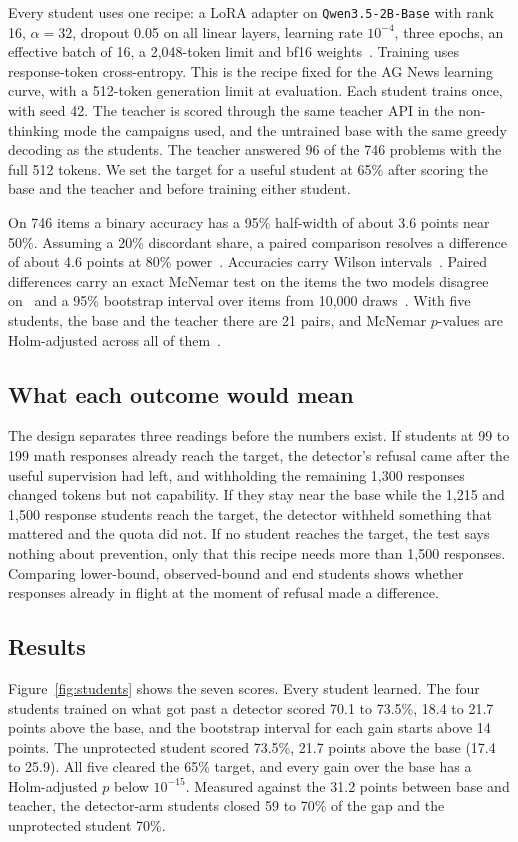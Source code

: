 \documentclass[journal]{IEEEtran}
\begin{document}
Every student uses one recipe: a LoRA adapter on \texttt{Qwen3.5-2B-Base} with rank 16, $\alpha=32$, dropout 0.05 on all linear layers, learning rate $10^{-4}$, three epochs, an effective batch of 16, a 2,048-token limit and bf16 weights~\cite{hu2022lora,loshchilov2019adamw}. Training uses response-token cross-entropy. This is the recipe fixed for the AG News learning curve, with a 512-token generation limit at evaluation. Each student trains once, with seed 42. The teacher is scored through the same teacher API in the non-thinking mode the campaigns used, and the untrained base with the same greedy decoding as the students. The teacher answered 96 of the 746 problems with the full 512 tokens. We set the target for a useful student at 65\% after scoring the base and the teacher and before training either student.

On 746 items a binary accuracy has a 95\% half-width of about 3.6 points near 50\%. Assuming a 20\% discordant share, a paired comparison resolves a difference of about 4.6 points at 80\% power~\cite{connor1987paired,card2020power}. Accuracies carry Wilson intervals~\cite{wilson1927probable}. Paired differences carry an exact McNemar test on the items the two models disagree on~\cite{mcnemar1947note} and a 95\% bootstrap interval over items from 10,000 draws~\cite{efron1993bootstrap,koehn2004significance}. With five students, the base and the teacher there are 21 pairs, and McNemar $p$-values are Holm-adjusted across all of them~\cite{holm1979simple}.

\subsection{What each outcome would mean}
The design separates three readings before the numbers exist. If students at 99 to 199 math responses already reach the target, the detector's refusal came after the useful supervision had left, and withholding the remaining 1,300 responses changed tokens but not capability. If they stay near the base while the 1,215 and 1,500 response students reach the target, the detector withheld something that mattered and the quota did not. If no student reaches the target, the test says nothing about prevention, only that this recipe needs more than 1,500 responses. Comparing lower-bound, observed-bound and end students shows whether responses already in flight at the moment of refusal made a difference.

\subsection{Results}
Figure~\ref{fig:students} shows the seven scores. Every student learned. The four students trained on what got past a detector scored 70.1 to 73.5\%, 18.4 to 21.7 points above the base, and the bootstrap interval for each gain starts above 14 points. The unprotected student scored 73.5\%, 21.7 points above the base (17.4 to 25.9). All five cleared the 65\% target, and every gain over the base has a Holm-adjusted $p$ below $10^{-15}$. Measured against the 31.2 points between base and teacher, the detector-arm students closed 59 to 70\% of the gap and the unprotected student 70\%.
\end{document}
